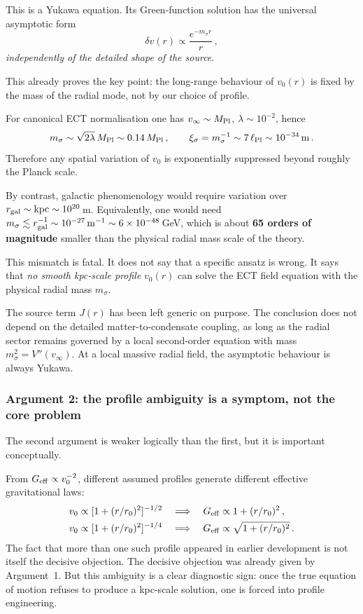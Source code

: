 \documentclass[11pt,a4paper]{article}
\numberwithin{equation}{section}
\begin{document}
This is a Yukawa equation.
Its Green-function solution has the universal asymptotic form
\begin{equation}
\delta v(r) \propto \frac{e^{-m_\sigma r}}{r}\,,
\end{equation}
\emph{independently of the detailed shape of the source}.

This already proves the key point: the long-range behaviour
of $v_0(r)$ is fixed by the mass of the radial mode, not by
our choice of profile.

For canonical ECT normalisation one has
$v_\infty \sim M_{\rm Pl}$, $\lambda \sim 10^{-2}$, hence
\begin{equation}
m_\sigma \sim \sqrt{2\lambda}\,M_{\rm Pl}
\sim 0.14\,M_{\rm Pl}\,,
\qquad
\xi_\sigma = m_\sigma^{-1}
\sim 7\,\ell_{\rm Pl}
\sim 10^{-34}\,\text{m}\,.
\end{equation}
Therefore any spatial variation of $v_0$ is exponentially
suppressed beyond roughly the Planck scale.

By contrast, galactic phenomenology would require variation
over $r_{\rm gal} \sim \mathrm{kpc} \sim 10^{20}\,$m.
Equivalently, one would need
$m_\sigma \lesssim r_{\rm gal}^{-1}
\sim 10^{-27}\,\mathrm{m}^{-1}
\sim 6\times10^{-48}\,$GeV,
which is about \textbf{65 orders of magnitude} smaller than the
physical radial mass scale of the theory.

This mismatch is fatal.
It does not say that a specific ansatz is wrong.
It says that \emph{no smooth kpc-scale profile} $v_0(r)$ can
solve the ECT field equation with the physical radial mass
$m_\sigma$.

The source term $J(r)$ has been left generic on purpose.
The conclusion does not depend on the detailed
matter-to-condensate coupling, as long as the radial sector
remains governed by a local second-order equation with mass
$m_\sigma^2 = V''(v_\infty)$.
At a local massive radial field, the asymptotic behaviour is
always Yukawa.

\subsubsection{Argument 2: the profile ambiguity is a symptom,
not the core problem}

The second argument is weaker logically than the first, but
it is important conceptually.

From $G_{\rm eff} \propto v_0^{-2}$, different assumed
profiles generate different effective gravitational laws:
\begin{align}
v_0 \propto [1+(r/r_0)^2]^{-1/2}
  &\quad\Longrightarrow\quad
  G_{\rm eff} \propto 1+(r/r_0)^2\,,\\
v_0 \propto [1+(r/r_0)^2]^{-1/4}
  &\quad\Longrightarrow\quad
  G_{\rm eff} \propto \sqrt{1+(r/r_0)^2}\,.
\end{align}
The fact that more than one such profile appeared in earlier
development is not itself the decisive objection.
The decisive objection was already given by Argument~1.
But this ambiguity is a clear diagnostic sign:
once the true equation of motion refuses to produce a
kpc-scale solution, one is forced into profile engineering.
\end{document}
